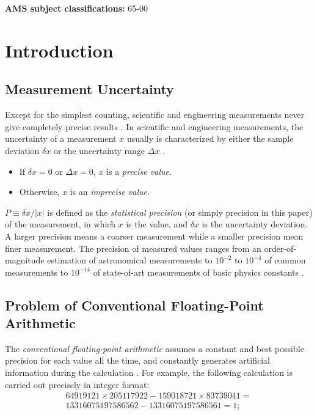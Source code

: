 \documentclass[twoside]{article}
\numberwithin{equation}{section}
\newcommand{\AMSsubj}[1]{\noindent\textbf{AMS subject classifications: }#1}
\begin{document}
\AMSsubj{65-00}



\clearpage
\section{Introduction}
\label{sec: introduction}

\subsection{Measurement Uncertainty}

Except for the simplest counting, scientific and engineering measurements never give completely precise results \cite{Statistical_Methods}\cite{Precisions_Physical_Measurements}. 
In scientific and engineering measurements, the uncertainty of a measurement $x$ usually is characterized by either the sample deviation $\delta x$ or the uncertainty range $\Delta x$ \cite{Statistical_Methods}\cite{Precisions_Physical_Measurements}.
\begin{itemize}
\item If $\delta x = 0$ or $\Delta x = 0$, $x$ is a \emph{precise value}.

\item Otherwise, $x$ is an \emph{imprecise value}.
\end{itemize}
 
$P \equiv \delta x / |x|$ is defined as the \emph{statistical precision} (or simply precision in this paper) of the measurement, in which $x$ is the value, and $\delta x$ is the uncertainty deviation.
A larger precision means a coarser measurement while a smaller precision mean finer measurement.
The precision of measured values ranges from an order-of-magnitude estimation of astronomical measurements to $10^{-2}$ to $10^{-4}$ of common measurements to $10^{-14}$ of state-of-art measurements of basic physics constants \cite{Basic_Constants_Measurements}.  



\subsection{Problem of Conventional Floating-Point Arithmetic}

The \emph{conventional floating-point arithmetic} \cite{Computer_Architecture}\cite{Floating_Point_Arithmetic}\cite{Floating_Point_Standard} assumes a constant and best possible precision for each value all the time, and constantly generates artificial information during the calculation \cite{Arithmetic_Digital_Computers}.  
For example, the following calculation is carried out precisely in integer format:
\begin{multline}
\label{eqn: int num calc}
64919121 \times 205117922 - 159018721 \times 83739041=\\
13316075197586562 - 13316075197586561 = 1;
\end{multline}
\end{document}
